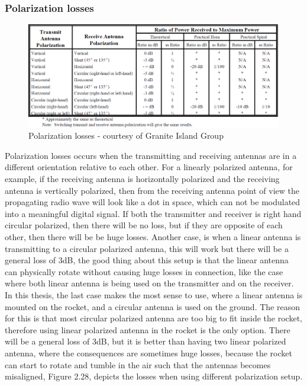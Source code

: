 \newpage

\subsubsection{Polarization losses}
\begin{figure}[h]
\hspace{-2cm}
\includegraphics[scale=0.5]{figures/PolarizationLoss.PNG}
\caption{Polarization losses - courtesy of Granite Island Group \cite{gig}}
\end{figure}

Polarization losses occurs when the transmitting and receiving antennas are in a different orientation relative to each other. For a linearly polarized antenna, for example, if the receiving antenna is horizontally polarized and the receiving antenna is vertically polarized, then from the receiving antenna point of view the propagating radio wave will look like a dot in space, which can not be modulated into a meaningful digital signal. If both the transmitter and receiver is right hand circular polarized, then there will be no loss, but if they are opposite of each other, then there will be be huge losses. Another case, is when a linear antenna is transmitting to a circular polarized antenna, this will work but there will be a general loss of 3dB, the good thing about this setup is that the linear antenna can physically rotate without causing huge losses in connection, like the case where both linear antenna is being used on the transmitter and on the receiver. In this thesis, the last case makes the most sense to use, where a linear antenna is mounted on the rocket, and a circular antenna is used on the ground. The reason for this is that most circular polarized antenna are too big to fit inside the rocket, therefore using linear polarized antenna in the rocket is the only option. There will be a general loss of 3dB, but it is better than having two linear polarized antenna, where the consequences are sometimes huge losses, because the rocket can start to rotate and tumble in the air such that the antennas becomes misaligned, Figure 2.28, depicts the losses when using different polarization setup.  

